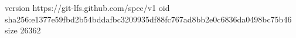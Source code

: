 version https://git-lfs.github.com/spec/v1
oid sha256:e1377e59fbd2b54bddafbc3209935df88fc767ad8bb2e0c6836da0498bc75b46
size 26362
